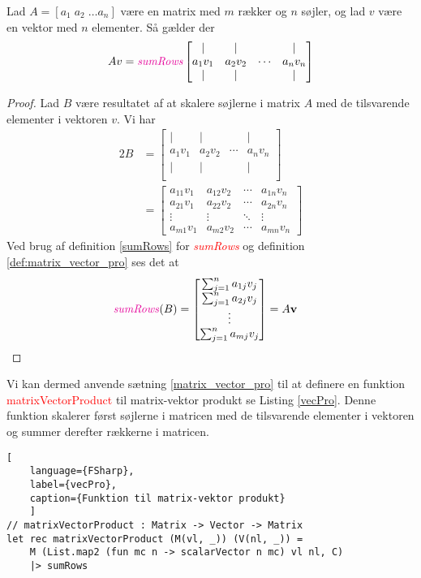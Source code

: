 \begin{theorem} \label{matrix_vector_pro}
    Lad $A = [a_1\; a_2\; \hdots a_n]$ være en matrix med $m$ rækker og $n$ søjler, og lad $v$ være en vektor med $n$ elementer. Så gælder der
    \[ Av = \textit{\textcolor{red}{sumRows}}
    \begin{bmatrix}
        | & | &        & | \\
        a_{1}v_{1} & a_{2}v_{2} & \cdots & a_{n}v_{n} \\
        | & | &        & | \\
    \end{bmatrix}
    \]
\end{theorem}
\begin{proof}
    Lad $B$ være resultatet af at skalere søjlerne i matrix $A$ med de tilsvarende elementer i vektoren $v$. Vi har
    \begin{alignat*}{2}
    B &= \begin{bmatrix}
        | & | &        & | \\
        a_{1}v_{1} & a_{2}v_{2} & \cdots & a_{n}v_{n} \\
        | & | &        & | \\
    \end{bmatrix} \\
    &= \begin{bmatrix}
        a_{11}v_{1} & a_{12}v_{2} & \cdots & a_{1n}v_{n} \\
        a_{21}v_{1} & a_{22}v_{2} & \cdots & a_{2n}v_{n} \\
        \vdots & \vdots & \ddots & \vdots \\
        a_{m1}v_{1} & a_{m2}v_{2} & \cdots & a_{mn}v_{n}
    \end{bmatrix}
    \end{alignat*}
    Ved brug af definition \ref{sumRows} for \textit{\textcolor{red}{sumRows}} og definition \ref{def:matrix_vector_pro} ses det at 
    \begin{alignat*}{2}
    \text{{\color{red}\textit{sumRows}}}(B) &= \begin{bmatrix}
        \sum_{j=1}^{n} a_{1j}v_{j} \\
        \sum_{j=1}^{n} a_{2j}v_{j} \\
        \vdots \\
        \sum_{j=1}^{n} a_{mj}v_{j}
    \end{bmatrix} = A\mathbf{v}
    \end{alignat*}
\end{proof}
Vi kan dermed anvende sætning \ref{matrix_vector_pro} til at definere en funktion \textcolor{red}{matrixVectorProduct} til matrix-vektor produkt se Listing \ref{vecPro}. Denne funktion skalerer først søjlerne i matricen med de tilsvarende elementer i vektoren og summer derefter rækkerne i matricen.
\begin{lstlisting}[
    language={FSharp}, 
    label={vecPro}, 
    caption={Funktion til matrix-vektor produkt}
    ]
// matrixVectorProduct : Matrix -> Vector -> Matrix
let rec matrixVectorProduct (M(vl, _)) (V(nl, _)) =
    M (List.map2 (fun mc n -> scalarVector n mc) vl nl, C) 
    |> sumRows
\end{lstlisting}

